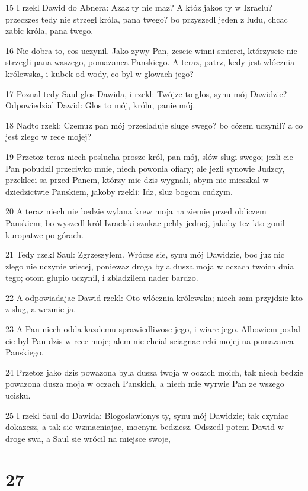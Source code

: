 \par 15 I rzekl Dawid do Abnera: Azaz ty nie maz? A któz jakos ty w Izraelu? przeczzes tedy nie strzegl króla, pana twego? bo przyszedl jeden z ludu, chcac zabic króla, pana twego.
\par 16 Nie dobra to, cos uczynil. Jako zywy Pan, zescie winni smierci, którzyscie nie strzegli pana waszego, pomazanca Panskiego. A teraz, patrz, kedy jest wlócznia królewska, i kubek od wody, co byl w glowach jego?
\par 17 Poznal tedy Saul glos Dawida, i rzekl: Twójze to glos, synu mój Dawidzie? Odpowiedzial Dawid: Glos to mój, królu, panie mój.
\par 18 Nadto rzekl: Czemuz pan mój przesladuje sluge swego? bo cózem uczynil? a co jest zlego w rece mojej?
\par 19 Przetoz teraz niech poslucha prosze król, pan mój, slów slugi swego; jezli cie Pan pobudzil przeciwko mnie, niech powonia ofiary; ale jezli synowie Judzcy, przekleci sa przed Panem, którzy mie dzis wygnali, abym nie mieszkal w dziedzictwie Panskiem, jakoby rzekli: Idz, sluz bogom cudzym.
\par 20 A teraz niech nie bedzie wylana krew moja na ziemie przed obliczem Panskiem; bo wyszedl król Izraelski szukac pchly jednej, jakoby tez kto gonil kuropatwe po górach.
\par 21 Tedy rzekl Saul: Zgrzeszylem. Wrócze sie, synu mój Dawidzie, boc juz nic zlego nie uczynie wiecej, poniewaz droga byla dusza moja w oczach twoich dnia tego; otom glupio uczynil, i zbladzilem nader bardzo.
\par 22 A odpowiadajac Dawid rzekl: Oto wlócznia królewska; niech sam przyjdzie kto z slug, a wezmie ja.
\par 23 A Pan niech odda kazdemu sprawiedliwosc jego, i wiare jego. Albowiem podal cie byl Pan dzis w rece moje; alem nie chcial sciagnac reki mojej na pomazanca Panskiego.
\par 24 Przetoz jako dzis powazona byla dusza twoja w oczach moich, tak niech bedzie powazona dusza moja w oczach Panskich, a niech mie wyrwie Pan ze wszego ucisku.
\par 25 I rzekl Saul do Dawida: Blogoslawionys ty, synu mój Dawidzie; tak czyniac dokazesz, a tak sie wzmacniajac, mocnym bedziesz. Odszedl potem Dawid w droge swa, a Saul sie wrócil na miejsce swoje,

\chapter{27}

